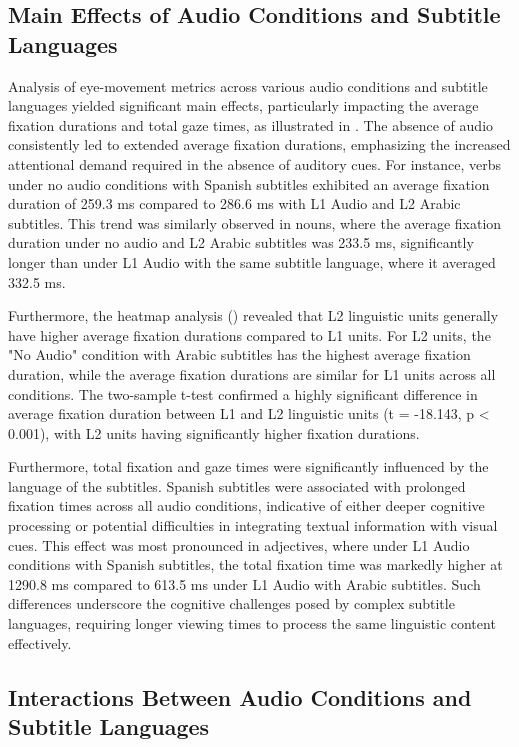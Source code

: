 \subsection{Main Effects of Audio Conditions and Subtitle Languages}\label{sub-sec-maineffectsofaudio}

Analysis of eye-movement metrics across various audio conditions and
subtitle languages yielded significant main effects, particularly
impacting the average fixation durations and total gaze times, as
illustrated in . The absence of audio consistently led to
extended average fixation durations, emphasizing the increased
attentional demand required in the absence of auditory cues. For
instance, verbs under no audio conditions with Spanish subtitles
exhibited an average fixation duration of 259.3 ms compared to 286.6 ms
with L1 Audio and L2 Arabic subtitles. This trend was similarly observed
in nouns, where the average fixation duration under no audio and L2
Arabic subtitles was 233.5 ms, significantly longer than under L1 Audio
with the same subtitle language, where it averaged 332.5 ms.

Furthermore, the heatmap analysis () revealed that L2 linguistic
units generally have higher average fixation durations compared to L1
units. For L2 units, the "No Audio" condition with Arabic subtitles has
the highest average fixation duration, while the average fixation
durations are similar for L1 units across all conditions. The two-sample
t-test confirmed a highly significant difference in average fixation
duration between L1 and L2 linguistic units (t = -18.143, p \textless{}
0.001), with L2 units having significantly higher fixation durations.

Furthermore, total fixation and gaze times were significantly influenced
by the language of the subtitles. Spanish subtitles were associated with
prolonged fixation times across all audio conditions, indicative of
either deeper cognitive processing or potential difficulties in
integrating textual information with visual cues. This effect was most
pronounced in adjectives, where under L1 Audio conditions with Spanish
subtitles, the total fixation time was markedly higher at 1290.8 ms
compared to 613.5 ms under L1 Audio with Arabic subtitles. Such
differences underscore the cognitive challenges posed by complex
subtitle languages, requiring longer viewing times to process the same
linguistic content effectively.

\subsection{Interactions Between Audio Conditions and Subtitle Languages}\label{sub-sec-interactionsbetweenaudio}

